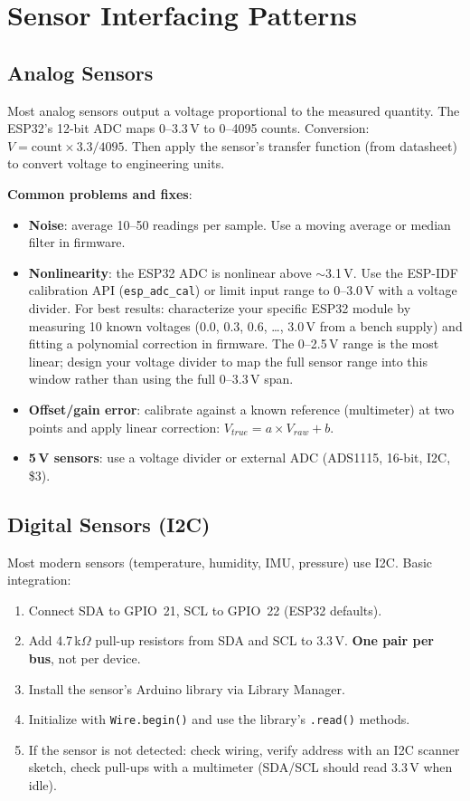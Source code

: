 \documentclass[11pt,letterpaper,twoside,openany]{book}
\begin{document}
\section{Sensor Interfacing Patterns}

\subsection{Analog Sensors}
Most analog sensors output a voltage proportional to the measured quantity. The ESP32's 12-bit ADC maps 0--3.3\,V to 0--4095 counts. Conversion: $V = \text{count} \times 3.3 / 4095$. Then apply the sensor's transfer function (from datasheet) to convert voltage to engineering units.

\textbf{Common problems and fixes}:
\begin{itemize}[nosep,leftmargin=1.5em]
\item \textbf{Noise}: average 10--50 readings per sample. Use a moving average or median filter in firmware.
\item \textbf{Nonlinearity}: the ESP32 ADC is nonlinear above $\sim$3.1\,V. Use the ESP-IDF calibration API (\texttt{esp\_adc\_cal}) or limit input range to 0--3.0\,V with a voltage divider. For best results: characterize your specific ESP32 module by measuring 10 known voltages (0.0, 0.3, 0.6, \ldots, 3.0\,V from a bench supply) and fitting a polynomial correction in firmware. The 0--2.5\,V range is the most linear; design your voltage divider to map the full sensor range into this window rather than using the full 0--3.3\,V span.
\item \textbf{Offset/gain error}: calibrate against a known reference (multimeter) at two points and apply linear correction: $V_{true} = a \times V_{raw} + b$.
\item \textbf{5\,V sensors}: use a voltage divider or external ADC (ADS1115, 16-bit, I2C, \$3).
\end{itemize}

\subsection{Digital Sensors (I2C)}
Most modern sensors (temperature, humidity, IMU, pressure) use I2C. Basic integration:
\begin{enumerate}[nosep,leftmargin=1.5em]
\item Connect SDA to GPIO~21, SCL to GPIO~22 (ESP32 defaults).
\item Add 4.7\,k$\Omega$ pull-up resistors from SDA and SCL to 3.3\,V. \textbf{One pair per bus}, not per device.
\item Install the sensor's Arduino library via Library Manager.
\item Initialize with \texttt{Wire.begin()} and use the library's \texttt{.read()} methods.
\item If the sensor is not detected: check wiring, verify address with an I2C scanner sketch, check pull-ups with a multimeter (SDA/SCL should read 3.3\,V when idle).
\end{enumerate}
\end{document}
